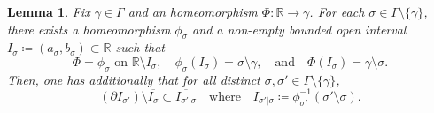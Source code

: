 \documentclass[a4paper, 11pt]{article} %
\theoremstyle{plain}
\newtheorem{lemma}[theorem]{Lemma}
\newcommand{\R}{\mathbb{R}}
\newcommand{\1}{\mathds 1}
\numberwithin{equation}{section}
\begin{document}
\begin{lemma}
    \label{lemma_adapted_homeo}
    Fix $\gamma\in\Gamma$ and an homeomorphism $\Phi:\R\to\gamma$. For each $\sigma\in\Gamma\setminus\{\gamma\}$, there exists a homeomorphism $\phi_{\sigma}$ and a non-empty bounded open interval $I_{\sigma}\coloneqq (a_\sigma,b_\sigma)\subset\R$ such that
        \[\text{$\Phi=\phi_\sigma$ on $\R\setminus I_\sigma$},\quad \phi_\sigma(I_\sigma)=\sigma\setminus\gamma,\quad\text{and}\quad \Phi(I_\sigma)=\gamma\setminus\sigma.\]
    Then, one has additionally that for all distinct $\sigma,\sigma'\in\Gamma\setminus\{\gamma\}$,
        \[(\partial I_{\sigma'})\setminus\overline{I_{\sigma}}\subset \overline{I_{\sigma'|\sigma}}\quad\text{where}\quad I_{\sigma'|\sigma}\coloneqq\phi_{\sigma'}^{-1}(\sigma'\setminus\sigma).\]
\end{lemma}
\end{document}
